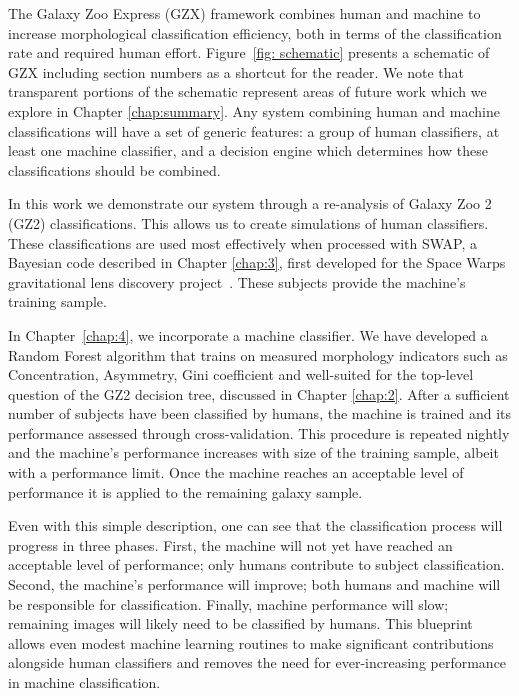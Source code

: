 
The Galaxy Zoo Express (GZX) framework combines human and machine to increase morphological classification efficiency, both in terms of the classification rate and required human effort. Figure~\ref{fig: schematic} presents a schematic of GZX including section numbers as a shortcut for the reader. We note that transparent portions  of the schematic represent areas of future work which we explore in Chapter \ref{chap:summary}. Any system combining human and machine classifications will have a set of generic features: a group of human classifiers, at least one machine classifier, and a decision engine which determines how these classifications should be combined.

In this work we demonstrate our system through a re-analysis of  Galaxy Zoo 2 (GZ2) classifications. This allows us to  create simulations of human classifiers. These classifications are used most effectively when processed with SWAP, a Bayesian code described in Chapter \ref{chap:3}, first developed for the Space Warps gravitational lens discovery project~\citep{Marshall2016}. These subjects provide the machine's training sample. 

In Chapter~\ref{chap:4}, we incorporate a machine classifier. We have developed a Random Forest algorithm that trains on measured morphology indicators such as Concentration, Asymmetry, Gini coefficient and  well-suited for the top-level question of the GZ2 decision tree, discussed in Chapter \ref{chap:2}. After a sufficient number of subjects have been classified by humans, the machine is trained and its performance assessed through cross-validation. This procedure is repeated nightly and the machine's performance increases with size of the training sample, albeit with a performance limit. Once the machine reaches an acceptable level of performance it is applied to the remaining galaxy sample. 

Even with this simple description, one can see that the classification process will progress in three phases.  First, the machine will not yet have reached an acceptable level of performance; only humans contribute to subject classification. Second, the machine's performance will improve; both humans and machine will be responsible for classification. Finally, machine performance will slow; remaining images will likely need to be classified by humans. This blueprint allows even modest machine learning routines to make significant contributions alongside human classifiers and removes the need for ever-increasing performance in machine classification.